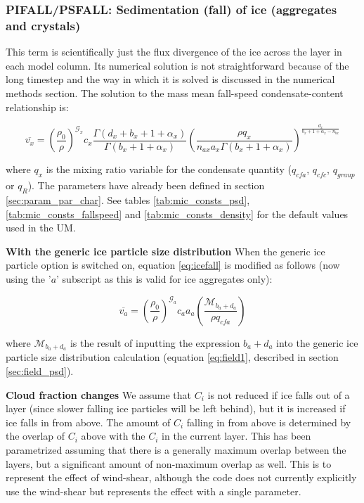 \documentclass{UMDP_article}
\def\bq{\begin{equation}}
\def\eq{\end{equation}}
\begin{document}
\subsubsection{PIFALL/PSFALL: Sedimentation (fall) of ice (aggregates and crystals)}

This term is scientifically just the flux divergence of the ice across the layer in
each model column. 
Its numerical solution is not straightforward because of the long timestep and the
way in which it is solved is discussed in the numerical methods section. The
solution to the mass mean fall-speed condensate-content relationship is:

\bq
\overline{v_x} = {\left( \frac{\rho_0}{\rho} \right)}^{\mathcal{G}_x} c_x
\frac{ \Gamma \left( d_x + b_x + 1 + \alpha_x \right) }{ \Gamma \left( b_x + 1 
+ \alpha_x \right) }
{ \left( \frac{ \rho q_{x} }{n_{ax} a_x \Gamma \left( b_x + 1 + 
\alpha_x \right) } \right)}
^{\frac{d_x}{b_x + 1 + \alpha_x - n_{bx} }}
\label{eq:icefall}
\eq

where $q_x$ is the mixing ratio variable for the condensate quantity 
($q_{cfa}$, $q_{cfc}$, $q_{graup}$ or $q_R$). The parameters have already been 
defined in section \ref{sec:param_par_char}. See tables \ref{tab:mic_consts_psd},
\ref{tab:mic_consts_fallspeed} and \ref{tab:mic_consts_density} for
the default values used in the UM.

\textbf{With the generic ice particle size distribution} When the
generic ice particle option is switched on, equation \ref{eq:icefall} is modified
as follows (now using the '$a$' subscript as this is valid for ice aggregates 
only):

\bq
\overline{v_a} = {\left( \frac{\rho_0}{\rho} \right)}^{\mathcal{G}_a} c_a a_a 
\left(\frac{\mathcal{M}_{b_a+d_a}}{\rho q_{cfa}}\right) 
\label{eq:icefallpsd}
\eq

where $\mathcal{M}_{b_a+d_a}$ is the result of inputting the expression $b_a + d_a$
into the generic ice particle size distribution calculation (equation
\ref{eq:field1}, described in section \ref{sec:field_psd}).

\textbf{Cloud fraction changes} We assume that $C_i$ is not
reduced if ice falls out of a layer (since slower falling ice particles will
be left behind), but it is increased if ice falls in from above. The amount
of $C_i$ falling in from above is determined by the overlap of $C_i$ above
with the $C_i$ in the current layer. This has been parametrized assuming that 
there is a generally maximum overlap between the layers, but a significant 
amount of non-maximum overlap as well. This is to represent the effect of 
wind-shear, although the code does not currently explicitly use the wind-shear 
but represents the effect with a single parameter.
\end{document}
